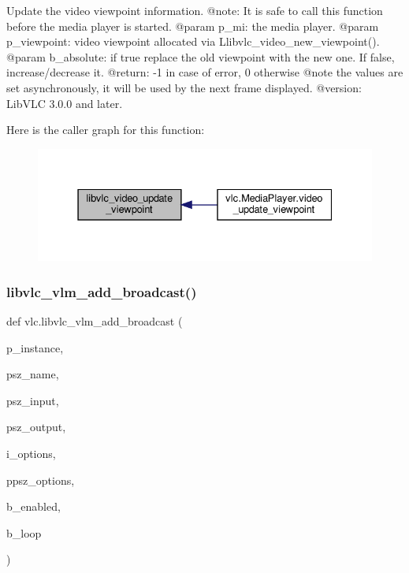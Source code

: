 \begin{DoxyVerb}Update the video viewpoint information.
@note: It is safe to call this function before the media player is started.
@param p_mi: the media player.
@param p_viewpoint: video viewpoint allocated via L{libvlc_video_new_viewpoint}().
@param b_absolute: if true replace the old viewpoint with the new one. If false, increase/decrease it.
@return: -1 in case of error, 0 otherwise @note the values are set asynchronously, it will be used by the next frame displayed.
@version: LibVLC 3.0.0 and later.
\end{DoxyVerb}
 Here is the caller graph for this function\+:
\nopagebreak
\begin{figure}[H]
\begin{center}
\leavevmode
\includegraphics[width=331pt]{namespacevlc_a3950e442a1f8e253586957f4e0c7dcd0_icgraph}
\end{center}
\end{figure}
\mbox{\label{namespacevlc_a7560226e5cabbe0664a8e51c772e07cf}} 
\subsubsection{\texorpdfstring{libvlc\+\_\+vlm\+\_\+add\+\_\+broadcast()}{libvlc\_vlm\_add\_broadcast()}}
{\footnotesize\ttfamily def vlc.\+libvlc\+\_\+vlm\+\_\+add\+\_\+broadcast (\begin{DoxyParamCaption}\item[{}]{p\+\_\+instance,  }\item[{}]{psz\+\_\+name,  }\item[{}]{psz\+\_\+input,  }\item[{}]{psz\+\_\+output,  }\item[{}]{i\+\_\+options,  }\item[{}]{ppsz\+\_\+options,  }\item[{}]{b\+\_\+enabled,  }\item[{}]{b\+\_\+loop }\end{DoxyParamCaption})}

